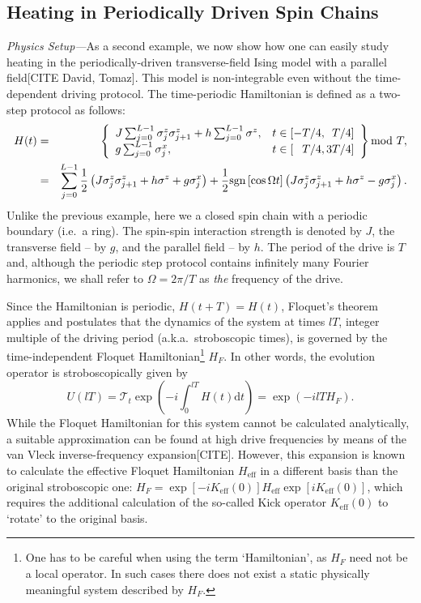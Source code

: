 \documentclass{SciPost}
\newcommand\0{\scalebox{-1}[1]{0}}
\begin{document}
\subsection{Heating in Periodically Driven Spin Chains}
\label{subsec:Floquet} 

\emph{Physics Setup---}As a second example, we now show how one can easily study heating in the periodically-driven transverse-field Ising model with a parallel field[CITE David, Tomaz]. This model is non-integrable even without the time-dependent driving protocol. The time-periodic Hamiltonian is defined as a two-step protocol as follows:  
\begin{eqnarray}
\label{eq:Floquet_H}
H(t) &=& \left\{ \begin{array}{cl}
J\sum_{j=0}^{L-1} \sigma^z_j\sigma^z_{j+1} + h\sum_{j=0}^{L-1}\sigma^z, &  t\in[-T/4,\phantom{3}T/4] \\
\kern-8em g\sum_{j=0}^{L-1} \sigma^x_j, &  t\in[\phantom{-} T/4,3T/4]
\end{array} \right\}  \mathrm{mod}\ T,\nonumber\\
&=& \sum_{j=0}^{L-1} \frac{1}{2}\left(J \sigma^z_j\sigma^z_{j+1} + h\sigma^z + g\sigma^x_j\right)
+ \frac{1}{2}\text{sgn}\left[\cos\Omega t\right]\left( J \sigma^z_j\sigma^z_{j+1} + h\sigma^z - g\sigma^x_j \right).
\end{eqnarray}
Unlike the previous example, here we a closed spin chain with a periodic boundary (i.e.~a ring). The spin-spin interaction strength is denoted by $J$, the transverse field -- by $g$, and the parallel field -- by $h$. The period of the drive is $T$ and, although the periodic step protocol contains infinitely many Fourier harmonics, we shall refer to $\Omega=2\pi/T$ as \emph{the} frequency of the drive.

Since the Hamiltonian is periodic, $H(t+T)=H(t)$, Floquet's theorem applies and postulates that the dynamics of the system at times $lT$, integer multiple of the driving period (a.k.a.~stroboscopic times), is governed by the time-independent Floquet Hamiltonian\footnote{One has to be careful when using the term `Hamiltonian', as $H_F$ need not be a local operator. In such cases there does not exist a static physically meaningful system described by $H_F$.} $H_F$. In other words, the evolution operator is stroboscopically given by
\begin{equation}
U(lT) = \mathcal{T}_t\exp\left(-i\int^{lT}_0H(t)\mathrm{d}t\right) = \exp(-ilT H_F).
\end{equation}
While the Floquet Hamiltonian for this system cannot be calculated analytically, a suitable approximation can be found at high drive frequencies by means of the van Vleck inverse-frequency expansion[CITE]. However, this expansion is known to calculate the effective Floquet Hamiltonian $H_\mathrm{eff}$ in a different basis than the original stroboscopic one: $H_F = \exp[-i K_\mathrm{eff}(0)] H_\mathrm{eff}\exp[i K_\mathrm{eff}(0)]$, which requires the additional calculation of the so-called Kick operator $K_\mathrm{eff}(0)$ to `rotate' to the original basis. 
\end{document}
